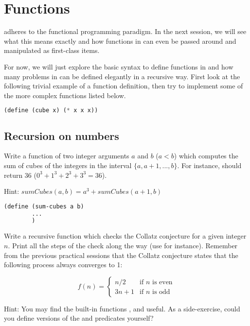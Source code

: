 \documentclass{../../../tp}
\begin{document}
\section{Functions}

\scheme adheres to the functional programming paradigm. In the next session, we will see what this means exactly and how functions in \scheme can even be passed around and manipulated as first-class items.

For now, we will just explore the basic syntax to define functions in \scheme and how many problems in \scheme can be defined elegantly in a recursive way. First look at the following trivial example of a function definition, then try to implement some of the more complex functions listed below.

	\begin{lstlisting}[language=lisp]
	(define (cube x) (* x x x))
	\end{lstlisting}




\subsection{Recursion on numbers}



\begin{instruction}
Write a function  of two integer arguments $a$ and $b$ ($a < b$) which computes the sum of cubes of the integers in the interval $\{a, a+1, ...,  b\}$. For instance,  should return 36 ($0^3 + 1^3 + 2^3 + 3^3 = 36$).
	
	Hint: $sumCubes(a,b) = a^3 + sumCubes(a+1, b)$
	
	\begin{lstlisting}[language=lisp]
	(define (sum-cubes a b) 
		... 
		)
	\end{lstlisting}
\end{instruction}



\begin{instruction}	
	
Write a recursive function  which checks the Collatz conjecture for a given integer $n$. Print all the steps of the check along the way (use  for instance). Remember from the previous practical sessions that the Collatz conjecture states that the following process always converges to 1:
	
		\begin{equation*}
		f(n) = 
		\begin{cases}
		n/2 & \text{if $n$ is even} \\
		3n + 1 & \text{if $n$ is odd} 
		\end{cases}
		\end{equation*}
	
Hint: You may find the built-in \scheme functions ,  and  useful. As a side-exercise, could you define versions of the  and  predicates yourself?
\end{instruction}
\end{document}
